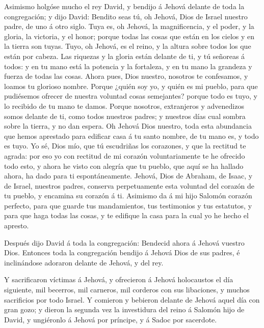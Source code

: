  Asimismo holgóse mucho el rey David, y bendijo á Jehová
delante de toda la congregación; y dijo David: Bendito seas tú, oh
Jehová, Dios de Israel nuestro padre, de uno á otro siglo. 
Tuya es, oh Jehová, la magnificencia, y el poder, y la gloria, la
victoria, y el honor; porque todas las cosas que están en los cielos y
en la tierra son tuyas. Tuyo, oh Jehová, es el reino, y la altura sobre
todos los que están por cabeza.  Las riquezas y la gloria
están delante de ti, y tú señoreas á todos: y en tu mano está la
potencia y la fortaleza, y en tu mano la grandeza y fuerza de todas las
cosas.  Ahora pues, Dios nuestro, nosotros te confesamos, y
loamos tu glorioso nombre.  Porque ¿quién soy yo, y quién
es mi pueblo, para que pudiésemos ofrecer de nuestra voluntad cosas
semejantes? porque todo es tuyo, y lo recibido de tu mano te damos.
 Porque nosotros, extranjeros y advenedizos somos delante
de ti, como todos nuestros padres; y nuestros días cual sombra sobre la
tierra, y no dan espera.  Oh Jehová Dios nuestro, toda esta
abundancia que hemos aprestado para edificar casa á tu santo nombre, de
tu mano es, y todo es tuyo.  Yo sé, Dios mío, que tú
escudriñas los corazones, y que la rectitud te agrada: por eso yo con
rectitud de mi corazón voluntariamente te he ofrecido todo esto, y ahora
he visto con alegría que tu pueblo, que aquí se ha hallado ahora, ha
dado para ti espontáneamente.  Jehová, Dios de Abraham, de
Isaac, y de Israel, nuestros padres, conserva perpetuamente esta
voluntad del corazón de tu pueblo, y encamina su corazón á ti.
 Asimismo da á mi hijo Salomón corazón perfecto, para que
guarde tus mandamientos, tus testimonios y tus estatutos, y para que
haga todas las cosas, y te edifique la casa para la cual yo he hecho el
apresto.

 Después dijo David á toda la congregación: Bendecid ahora
á Jehová vuestro Dios. Entonces toda la congregación bendijo á Jehová
Dios de sus padres, é inclinándose adoraron delante de Jehová, y del
rey.

 Y sacrificaron víctimas á Jehová, y ofrecieron á Jehová
holocaustos el día siguiente, mil becerros, mil carneros, mil corderos
con sus libaciones, y muchos sacrificios por todo Israel. 
Y comieron y bebieron delante de Jehová aquel día con gran gozo; y
dieron la segunda vez la investidura del reino á Salomón hijo de David,
y ungiéronlo á Jehová por príncipe, y á Sadoc por sacerdote.

